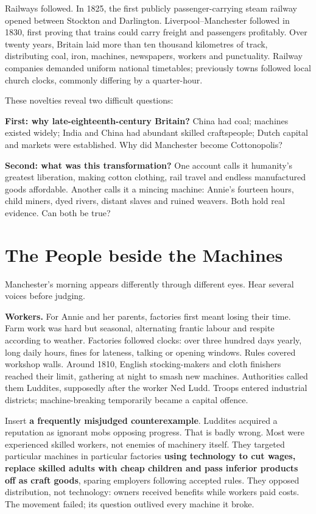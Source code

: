 Railways followed. In 1825, the first publicly passenger-carrying steam railway opened between Stockton and Darlington. Liverpool--Manchester followed in 1830, first proving that trains could carry freight and passengers profitably. Over twenty years, Britain laid more than ten thousand kilometres of track, distributing coal, iron, machines, newspapers, workers and punctuality. Railway companies demanded uniform national timetables; previously towns followed local church clocks, commonly differing by a quarter-hour.

These novelties reveal two difficult questions:

\textbf{First: why late-eighteenth-century Britain?} China had coal; machines existed widely; India and China had abundant skilled craftspeople; Dutch capital and markets were established. Why did Manchester become Cottonopolis?

\textbf{Second: what was this transformation?} One account calls it humanity's greatest liberation, making cotton clothing, rail travel and endless manufactured goods affordable. Another calls it a mincing machine: Annie's fourteen hours, child miners, dyed rivers, distant slaves and ruined weavers. Both hold real evidence. Can both be true?

\section{The People beside the Machines}
Manchester's morning appears differently through different eyes. Hear several voices before judging.

\textbf{Workers.} For Annie and her parents, factories first meant losing their time. Farm work was hard but seasonal, alternating frantic labour and respite according to weather. Factories followed clocks: over three hundred days yearly, long daily hours, fines for lateness, talking or opening windows. Rules covered workshop walls. Around 1810, English stocking-makers and cloth finishers reached their limit, gathering at night to smash new machines. Authorities called them Luddites, supposedly after the worker Ned Ludd. Troops entered industrial districts; machine-breaking temporarily became a capital offence.

Insert \textbf{a frequently misjudged counterexample}. Luddites acquired a reputation as ignorant mobs opposing progress. That is badly wrong. Most were experienced skilled workers, not enemies of machinery itself. They targeted particular machines in particular factories \textbf{using technology to cut wages, replace skilled adults with cheap children and pass inferior products off as craft goods}, sparing employers following accepted rules. They opposed distribution, not technology: owners received benefits while workers paid costs. The movement failed; its question outlived every machine it broke.

